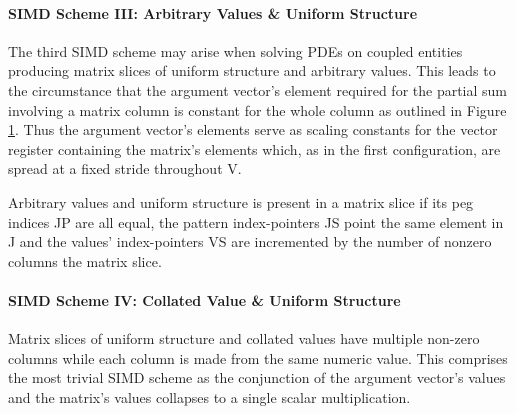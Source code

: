         \paragraph{SIMD Scheme III: Arbitrary Values \& Uniform Structure}

          The third SIMD scheme may arise when solving PDEs on coupled entities producing matrix slices of uniform
          structure and arbitrary values. This leads to the circumstance that the argument vector's element required for
          the partial sum involving a matrix column is constant for the whole column as outlined in Figure
          \ref{fig:simd-scheme-iii-data-layout}. Thus the argument vector's elements serve as scaling constants for the
          vector register containing the matrix's elements which, as in the first configuration, are spread at a fixed
          stride throughout V.

          Arbitrary values and uniform structure is present in a matrix slice if its peg indices JP are all equal, the
          pattern index-pointers JS point the same element in J and the values' index-pointers VS are incremented by the
          number of nonzero columns the matrix slice.

          \begin{figure}[H]
            \centering
            \captionsetup{width=0.9\columnwidth}
            
            \label{fig:simd-scheme-iii-data-layout}
          \end{figure}

        \paragraph{SIMD Scheme IV: Collated Value \& Uniform Structure}

          Matrix slices of uniform structure and collated values have multiple non-zero columns while each column is
          made from the same numeric value. This comprises the most trivial SIMD scheme as the conjunction of the
          argument vector's values and the matrix's values collapses to a single scalar multiplication.

